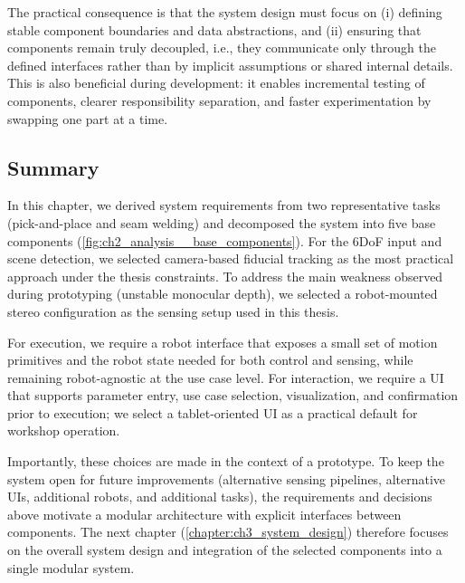 The practical consequence is that the system design must focus on (i) defining stable component boundaries and data abstractions, and (ii) ensuring that components remain truly decoupled, i.e., they communicate only through the defined interfaces rather than by implicit assumptions or shared internal details. This is also beneficial during development: it enables incremental testing of components, clearer responsibility separation, and faster experimentation by swapping one part at a time.

\subsection{Summary} \label{subsec:ch2_analysis_summary}

In this chapter, we derived system requirements from two representative tasks (pick-and-place and seam welding) and decomposed the system into five base components (\autoref{fig:ch2_analysis__base_components}). For the 6DoF input and scene detection, we selected camera-based fiducial tracking as the most practical approach under the thesis constraints. To address the main weakness observed during prototyping (unstable monocular depth), we selected a robot-mounted stereo configuration as the sensing setup used in this thesis.

For execution, we require a robot interface that exposes a small set of motion primitives and the robot state needed for both control and sensing, while remaining robot-agnostic at the use case level. For interaction, we require a UI that supports parameter entry, use case selection, visualization, and confirmation prior to execution; we select a tablet-oriented UI as a practical default for workshop operation.

Importantly, these choices are made in the context of a prototype. To keep the system open for future improvements (alternative sensing pipelines, alternative UIs, additional robots, and additional tasks), the requirements and decisions above motivate a modular architecture with explicit interfaces between components. The next chapter (\autoref{chapter:ch3_system_design}) therefore focuses on the overall system design and integration of the selected components into a single modular system.
